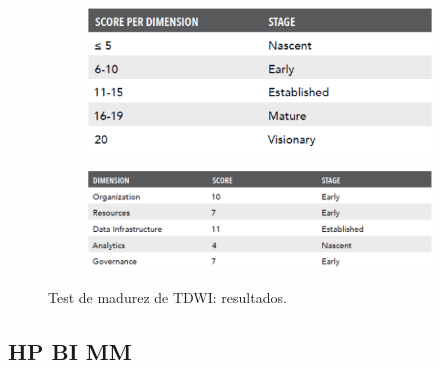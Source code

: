 \begin{figure}[h]
\centering
\begin{subfigure}{.4078\textwidth}
\centering
\includegraphics[width=\textwidth]{fotos/5.png}
\end{subfigure}%
\begin{subfigure}{.5922\textwidth}
\centering
\includegraphics[width=\textwidth]{fotos/6.png}
\end{subfigure}
\caption{Test de madurez de TDWI: resultados.}
\label{fig:tdwi}
\end{figure}

\subsection{HP BI MM}

